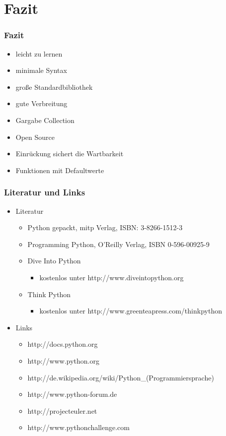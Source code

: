\documentclass[10pt]{beamer}
\begin{document}
\section{Fazit}
 \begin{frame}
  \frametitle{Fazit}
   \begin{itemize}
    \item leicht zu lernen
    \item minimale Syntax
    \item große Standardbibliothek
    \item gute Verbreitung
    \item Gargabe Collection
    \item Open Source
    \item Einrückung sichert die Wartbarkeit
    \item Funktionen mit Defaultwerte
   \end{itemize}
\end{frame}

 \begin{frame}
  \frametitle{Literatur und Links}
   \begin{itemize}
    \item Literatur
     \begin{itemize}
      \item Python gepackt, {\scriptsize mitp Verlag, ISBN: 3-8266-1512-3}
      \item Programming Python, {\scriptsize O'Reilly Verlag, ISBN 0-596-00925-9}
      \item Dive Into Python
       \begin{itemize}
        \item kostenlos unter http://www.diveintopython.org
       \end{itemize}
      \item Think Python
       \begin{itemize}
        \item kostenlos unter http://www.greenteapress.com/thinkpython
       \end{itemize}
     \end{itemize}
    \item Links
     \begin{itemize}
      \item http://docs.python.org
      \item http://www.python.org
      \item http://de.wikipedia.org/wiki/Python\_(Programmiersprache)
      \item http://www.python-forum.de
      \item http://projecteuler.net
      \item http://www.pythonchallenge.com
     \end{itemize}
   \end{itemize}
\end{frame}
\end{document}
